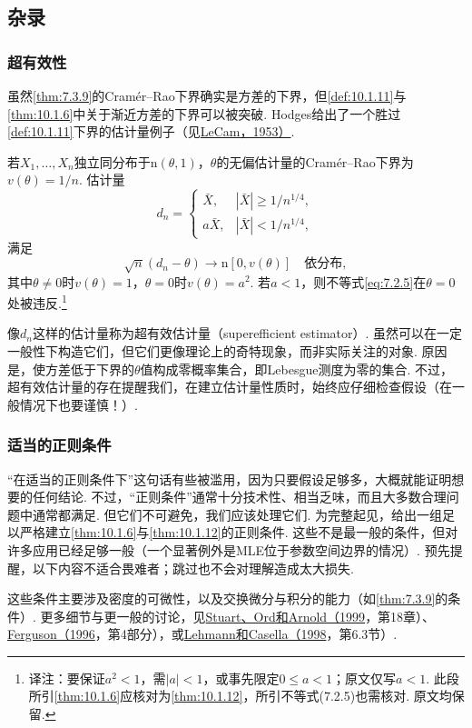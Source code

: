 \subsection{杂录}\label{sec:10.6}
\subsubsection{超有效性}\label{sec:10.6.1}
虽然\autoref{thm:7.3.9}的Cramér--Rao下界确实是方差的下界，但\autoref{def:10.1.11}与\autoref{thm:10.1.6}中关于渐近方差的下界可以被突破. Hodges给出了一个胜过\autoref{def:10.1.11}下界的估计量例子（见\hyperref[bib:source194]{LeCam，1953）}.

若$X_1,\ldots,X_n$独立同分布于$\mathrm n(\theta,1)$，$\theta$的无偏估计量的Cramér--Rao下界为$v(\theta)=1/n$. 估计量
$$d_n=\begin{cases}\bar X,&|\bar X|\geq1/n^{1/4},\\a\bar X,&|\bar X|<1/n^{1/4},\end{cases}$$
满足
$$\sqrt n(d_n-\theta)\longrightarrow\mathrm n[0,v(\theta)]\quad\text{依分布},$$
其中$\theta\ne0$时$v(\theta)=1$，$\theta=0$时$v(\theta)=a^2$. 若$a<1$，则不等式\eqref{eq:7.2.5}在$\theta=0$处被违反.\footnote{译注：要保证$a^2<1$，需$|a|<1$，或事先限定$0\leq a<1$；原文仅写$a<1$. 此段所引\autoref{thm:10.1.6}应核对为\autoref{thm:10.1.12}，所引不等式(7.2.5)也需核对. 原文均保留.}

像$d_n$这样的估计量称为超有效估计量（superefficient estimator）. 虽然可以在一定一般性下构造它们，但它们更像理论上的奇特现象，而非实际关注的对象. 原因是，使方差低于下界的$\theta$值构成零概率集合，即Lebesgue测度为零的集合. 不过，超有效估计量的存在提醒我们，在建立估计量性质时，始终应仔细检查假设（在一般情况下也要谨慎！）.

\subsubsection{适当的正则条件}\label{sec:10.6.2}
“在适当的正则条件下”这句话有些被滥用，因为只要假设足够多，大概就能证明想要的任何结论. 不过，“正则条件”通常十分技术性、相当乏味，而且大多数合理问题中通常都满足. 但它们不可避免，我们应该处理它们. 为完整起见，给出一组足以严格建立\autoref{thm:10.1.6}与\autoref{thm:10.1.12}的正则条件. 这些不是最一般的条件，但对许多应用已经足够一般（一个显著例外是MLE位于参数空间边界的情况）. 预先提醒，以下内容不适合畏难者；跳过也不会对理解造成太大损失.

这些条件主要涉及密度的可微性，以及交换微分与积分的能力（如\autoref{thm:7.3.9}的条件）. 更多细节与更一般的讨论，见\hyperref[bib:source311]{Stuart、Ord和Arnold（1999}，第18章）、\hyperref[bib:source120]{Ferguson（1996}，第4部分），或\hyperref[bib:source200]{Lehmann和Casella（1998}，第6.3节）.

